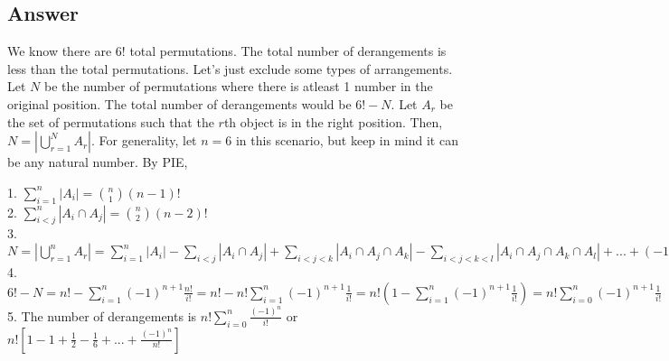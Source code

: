 \documentclass{article}
\begin{document}
\subsection{Answer}
We know there are $6!$ total permutations. The total
number of derangements is less than the total permutations.
Let's just exclude some types of arrangements. Let $N$ be
the number of permutations where there is atleast 1 number
in the original position. The total number of derangements
would be $6! - N$. Let $A_r$ be the set of permutations
such that the $r$th object is in the right position. Then,
$N = |\bigcup\limits_{r=1}^{N}A_r|$. For generality, let $n=6$ in
this scenario, but keep in mind it can be any natural number. By PIE,\\
\begin{center}
    \begin{large}
        1. $\sum\limits_{i=1}^{n}{|A_i|} = \binom{n}{1}(n-1)!$\\
        2.  $\sum\limits_{i<j}^{n}{|A_i \cap A_j|} = \binom{n}{2}(n-2)!$\\
        3. $N = |\bigcup\limits_{r=1}^{n}A_r|
            = \sum\limits_{i=1}^{n}{|A_i|}
            - \sum\limits_{i<j}{|A_i \cap A_j|}
            + \sum\limits_{i<j<k}{|A_i \cap A_j \cap A_k|}
            - \sum\limits_{i<j<k<l}
            {|A_i\cap{A_j}\cap{A_k}\cap{A_l}|} + ...
            + (-1)^{n+1}|A_1 \cap A_2 \cap ... \cap A_n|
            = \sum\limits_{i=1}^{n}{\binom{n}{i}(-1)^{n+1}
            (n-i)!}=\sum\limits_{i=1}^{n}{(-1)^{n+1}\frac{n!}{i!}}$\\
        4. $6! - N = n! - \sum\limits_{i=1}^{n}{(-1)^{n+1}\frac{n!}{i!}}
            = n! - n!\sum\limits_{i=1}^{n}{(-1)^{n+1}\frac{1}{i!}}
            = n!(1-\sum\limits_{i=1}^{n}{(-1)^{n+1}\frac{1}{i!}})
            = n!\sum\limits_{i=0}^{n}{(-1)^{n+1}\frac{1}{i!}}$\\
        5. The number of derangements is
        $\boxed{n!\sum\limits_{i=0}^{n}{\frac{(-1)^{n}}{i!}}}$ or
        $\boxed{n![1-1+\frac{1}{2}-\frac{1}{6}+...+\frac{(-1)^n}{n!}]}$
    \end{large}
    
\end{center}
\end{document}
